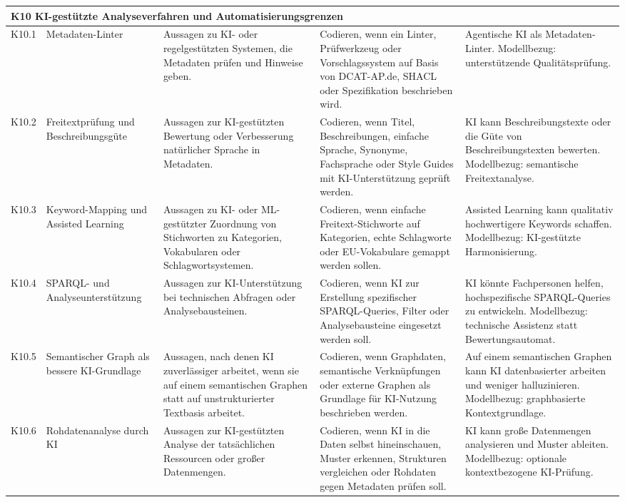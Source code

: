 \begin{longtable}{p{1cm} p{2.5cm} p{3.2cm} p{4.5cm} p{4.5cm}}
\midrule
\multicolumn{5}{l}{\textbf{K10 KI-gestützte Analyseverfahren und Automatisierungsgrenzen}} \\
\midrule

K10.1 & Metadaten-Linter
& Aussagen zu KI- oder regelgestützten Systemen, die Metadaten prüfen und Hinweise geben.
& Codieren, wenn ein Linter, Prüfwerkzeug oder Vorschlagssystem auf Basis von DCAT-AP.de, SHACL oder Spezifikation beschrieben wird.
& Agentische KI als Metadaten-Linter. Modellbezug: unterstützende Qualitätsprüfung. \\

K10.2 & Freitextprüfung und Beschreibungsgüte
& Aussagen zur KI-gestützten Bewertung oder Verbesserung natürlicher Sprache in Metadaten.
& Codieren, wenn Titel, Beschreibungen, einfache Sprache, Synonyme, Fachsprache oder Style Guides mit KI-Unterstützung geprüft werden.
& KI kann Beschreibungstexte oder die Güte von Beschreibungstexten bewerten. Modellbezug: semantische Freitextanalyse. \\

K10.3 & Keyword-Mapping und Assisted Learning
& Aussagen zu KI- oder ML-gestützter Zuordnung von Stichworten zu Kategorien, Vokabularen oder Schlagwortsystemen.
& Codieren, wenn einfache Freitext-Stichworte auf Kategorien, echte Schlagworte oder EU-Vokabulare gemappt werden sollen.
& Assisted Learning kann qualitativ hochwertigere Keywords schaffen. Modellbezug: KI-gestützte Harmonisierung. \\

K10.4 & SPARQL- und Analyseunterstützung
& Aussagen zur KI-Unterstützung bei technischen Abfragen oder Analysebausteinen.
& Codieren, wenn KI zur Erstellung spezifischer SPARQL-Queries, Filter oder Analysebausteine eingesetzt werden soll.
& KI könnte Fachpersonen helfen, hochspezifische SPARQL-Queries zu entwickeln. Modellbezug: technische Assistenz statt Bewertungsautomat. \\

K10.5 & Semantischer Graph als bessere KI-Grundlage
& Aussagen, nach denen KI zuverlässiger arbeitet, wenn sie auf einem semantischen Graphen statt auf unstrukturierter Textbasis arbeitet.
& Codieren, wenn Graphdaten, semantische Verknüpfungen oder externe Graphen als Grundlage für KI-Nutzung beschrieben werden.
& Auf einem semantischen Graphen kann KI datenbasierter arbeiten und weniger halluzinieren. Modellbezug: graphbasierte Kontextgrundlage. \\

K10.6 & Rohdatenanalyse durch KI
& Aussagen zur KI-gestützten Analyse der tatsächlichen Ressourcen oder großer Datenmengen.
& Codieren, wenn KI in die Daten selbst hineinschauen, Muster erkennen, Strukturen vergleichen oder Rohdaten gegen Metadaten prüfen soll.
& KI kann große Datenmengen analysieren und Muster ableiten. Modellbezug: optionale kontextbezogene KI-Prüfung. \\


\end{longtable}
